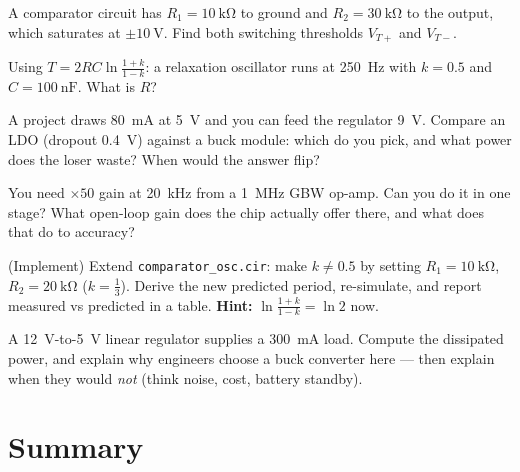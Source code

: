 \begin{exercise}[medium]
A comparator circuit has $R_1 = \qty{10}{\kilo\ohm}$ to ground and
$R_2 = \qty{30}{\kilo\ohm}$ to the output, which saturates at
$\pm\qty{10}{\volt}$. Find both switching thresholds $V_{T+}$ and
$V_{T-}$.
\end{exercise}

\begin{exercise}[medium]
Using $T = 2RC\ln\frac{1+k}{1-k}$: a relaxation oscillator runs at
\qty{250}{\hertz} with $k = 0.5$ and $C = \qty{100}{\nano\farad}$.
What is $R$?
\end{exercise}

\begin{exercise}[medium]
A project draws \qty{80}{\milli\ampere} at \qty{5}{\volt} and you can
feed the regulator \qty{9}{\volt}. Compare an LDO (dropout
\qty{0.4}{\volt}) against a buck module: which do you pick, and what
power does the loser waste? When would the answer flip?
\end{exercise}

\begin{exercise}[medium]
You need $\times50$ gain at \qty{20}{\kilo\hertz} from a
\qty{1}{\mega\hertz} GBW op-amp. Can you do it in one stage? What
open-loop gain does the chip actually offer there, and what does that
do to accuracy?
\end{exercise}

\begin{exercise}[hard]
(Implement) Extend \texttt{comparator\_osc.cir}: make $k \neq 0.5$ by
setting $R_1 = \qty{10}{\kilo\ohm}$, $R_2 = \qty{20}{\kilo\ohm}$
($k = \frac{1}{3}$). Derive the new predicted period, re-simulate, and
report measured vs predicted in a table. \textbf{Hint:}
$\ln\frac{1+k}{1-k} = \ln 2$ now.
\end{exercise}

\begin{exercise}[hard]
A \qty{12}{\volt}-to-\qty{5}{\volt} linear regulator supplies a
\qty{300}{\milli\ampere} load. Compute the dissipated power, and explain
why engineers choose a buck converter here — then explain when they
would \emph{not} (think noise, cost, battery standby).
\end{exercise}

\section{Summary}
\label{sec:summary07}

